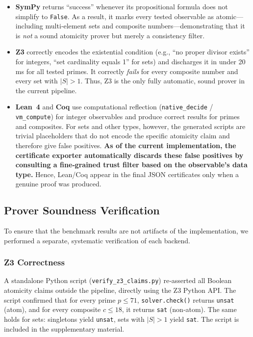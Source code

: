 \begin{itemize}
    \item \textbf{SymPy} returns ``success'' whenever its propositional
          formula does not simplify to \texttt{False}.  As a result, it
          marks every tested observable as atomic—including multi‑element
          sets and composite numbers—demonstrating that it is \emph{not}
          a sound atomicity prover but merely a consistency filter.
    \item \textbf{Z3} correctly encodes the existential condition (e.g.,
          ``no proper divisor exists'' for integers, ``set cardinality
          equals 1'' for sets) and discharges it in under 20\,ms for all
          tested primes.  It correctly \emph{fails} for every composite
          number and every set with $|S|>1$.  Thus, Z3 is the only fully
          automatic, sound prover in the current pipeline.
    \item \textbf{Lean~4} and \textbf{Coq} use computational reflection
          (\texttt{native\_decide} / \texttt{vm\_compute}) for integer
          observables and produce correct results for primes and composites.
          For sets and other types, however, the generated scripts are
          trivial placeholders that do not encode the specific atomicity
          claim and therefore give false positives.  \textbf{As of the
          current implementation, the certificate exporter automatically
          discards these false positives by consulting a fine‑grained
          trust filter based on the observable's data type.}  Hence,
          Lean/Coq appear in the final JSON certificates only when a
          genuine proof was produced.
\end{itemize}

\subsection{Prover Soundness Verification}

To ensure that the benchmark results are not artifacts of the implementation,
we performed a separate, systematic verification of each backend.

\subsubsection{Z3 Correctness}
A standalone Python script (\texttt{verify\_z3\_claims.py}) re‑asserted all
Boolean atomicity claims outside the \Apeiron{} pipeline, directly using the
Z3 Python API.  The script confirmed that for every prime $p \leq 71$,
\texttt{solver.check()} returns \texttt{unsat} (atom), and for every composite
$c \leq 18$, it returns \texttt{sat} (non‑atom).  The same holds for sets:
singletons yield \texttt{unsat}, sets with $|S|>1$ yield \texttt{sat}.
The script is included in the supplementary material.

